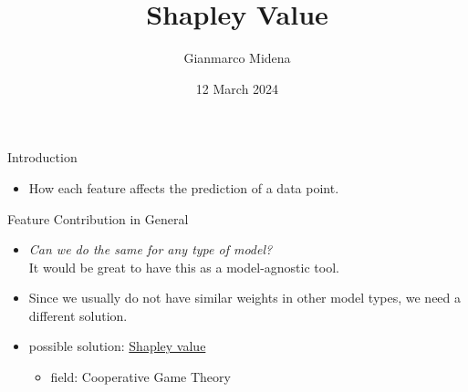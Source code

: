 \documentclass[dvipsnames]{beamer}
\title%
{Shapley Value}
\author{Gianmarco Midena}
\institute{Aalto University}
\date{12 March 2024}
\newcommand{\red}[1]{{\color{red} #1}}
\begin{document}
\begin{frame}
\titlepage
\end{frame}


\begin{frame}{Introduction}
	\begin{itemize}
		\item How each feature affects the prediction of a data point.
	\end{itemize}
\end{frame}



\begin{frame}{Feature Contribution in General}
	\begin{itemize}
		\item \emph{Can we do the same for any type of model?}
		\\It would be great to have this as a model-agnostic tool.
		\item \red{Since we usually do not have similar weights in other model types, we need a different solution.}
		\item possible solution: \underline{Shapley value}
		\begin{itemize}
			\item field: Cooperative Game Theory
		\end{itemize}
	\end{itemize}
\end{frame}



\end{document}
